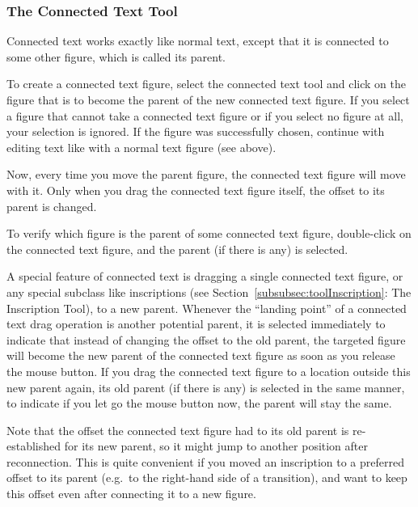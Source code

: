 
\subsubsection{The Connected Text Tool}
\label{subsubsec:toolConnectedText}

Connected text works exactly like normal text, except that it is connected
to some other figure, which is called its parent.

To create a connected text figure, select the connected text tool and
click on the figure that is to become the parent of the new connected text
figure. If you select a figure that cannot take a connected text figure
or if you select no figure at all, your selection is ignored.
If the figure was successfully chosen,
continue with editing text like with a normal text figure (see above).

Now, every time you move the parent figure, the connected text figure will
move with it. Only when you drag the connected text figure itself, the offset
to its parent is changed.

To verify which figure is the parent of some connected text figure,
double-click on the connected text figure, and the parent (if there
is any) is selected.

A special feature of connected text
is dragging a single connected text figure, or any special subclass like inscriptions
(see Section~\ref{subsubsec:toolInscription}: The Inscription Tool),
to a new parent.
Whenever the ``landing point'' of a connected text drag operation is another
potential parent, it is selected immediately to indicate that
instead of changing the offset to the old parent, the
targeted figure will become the new parent of the connected text figure
as soon as you release the mouse button.
If you drag the connected text figure to a location outside this new parent
again, its old parent (if there is any) is selected in the same manner,
to indicate if you let go the mouse button now, the parent will stay the same.

Note that the offset the connected text figure had to its old parent is re-established
for its new parent, so it might jump to another position after reconnection.
This is quite convenient if you moved an inscription to a
preferred offset to its parent (e.g.\ to the right-hand side of a transition),
and want to keep this offset even after connecting it to a new figure.

